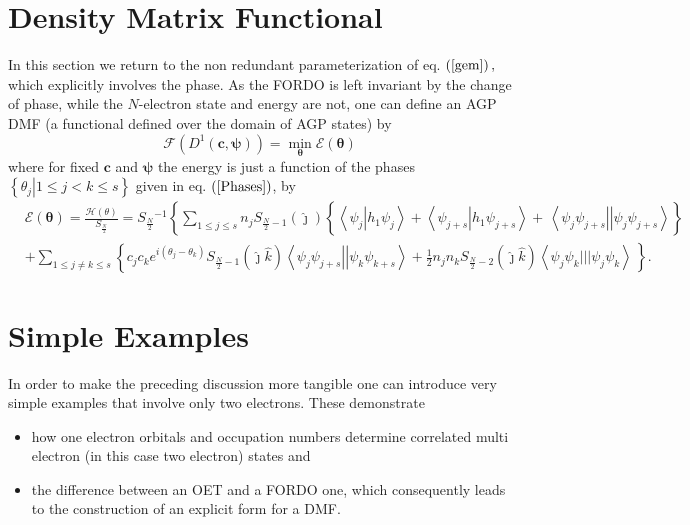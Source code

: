 \documentclass[aps,preprint]{revtex4}%
\begin{document}
\section{Density Matrix Functional\label{DenMatFun}}

In this section we return to the non redundant parameterization of eq.
$\left(  \ref{gem}\right)  ,$ which explicitly involves the phase. As the
FORDO is left invariant by the change of phase, while the $N$-electron state
and energy are not, one can define an AGP DMF (a functional defined over the
domain of AGP states) by%
\begin{equation}
\mathcal{F}\left(  D^{1}\left(  \boldsymbol{c},\boldsymbol{\psi}\right)
\right)  =\min_{\boldsymbol{\theta}}\mathcal{E}\left(  \boldsymbol{\theta
}\right)
\end{equation}
where for fixed $\boldsymbol{c}$ and $\boldsymbol{\psi}$ the energy is just a
function of the phases $\left\{  \left.  \theta_{j}\right\vert 1\leq j<k\leq
s\right\}  $ given in eq. $\left(  \ref{Phases}\right)  $, by
\begin{align}
&  \mathcal{E}\left(  \boldsymbol{\theta}\right)  =\frac{\mathcal{H}\left(
\theta\right)  }{S_{\frac{N}{2}}}=S_{\frac{N}{2}}{}^{-1}\left\{  \sum_{1\leq
j\leq s}n_{j}S_{\frac{N}{2}-1}\left(  \hat{\jmath}\right)  \left\{  \overset
{}{\left\langle \psi_{j}\left\vert h_{1}\psi_{j}\right.  \right\rangle
+\left\langle \psi_{j+s}\left\vert h_{1}\psi_{j+s}\right.  \right\rangle
}+\,\left\langle \psi_{j}\psi_{j+s}\right\vert \left\vert \psi_{j}\psi
_{j+s}\right\rangle \right\}  \right.  \nonumber\\
&  +\sum_{1\leq j\neq k\leq s}\left\{  c_{j}c_{k}e^{i\left(  \theta_{j}%
-\theta_{k}\right)  }S_{\frac{N}{2}-1}\left(  \hat{\jmath}\hat{k}\right)
\left\langle \psi_{j}\psi_{j+s}\right\vert \left\vert \psi_{k}\psi
_{k+s}\right\rangle +\frac{1}{2}n_{j}n_{k}S_{\frac{N}{2}-2}\left(  \hat
{\jmath}\hat{k}\right)  \left\langle \psi_{j}\psi_{k}|||\psi_{j}\psi
_{k}\right\rangle \,\overset{}{}\right\}  .
\end{align}


\section{Simple Examples}

In order to make the preceding discussion more tangible one can introduce very
simple examples that involve only two electrons. These demonstrate

\begin{itemize}
\item how one electron orbitals and occupation numbers determine correlated
multi electron (in this case two electron) states and

\item the difference between an OET and a FORDO one, which consequently leads
to the construction of an explicit form for a DMF.
\end{itemize}
\end{document}
